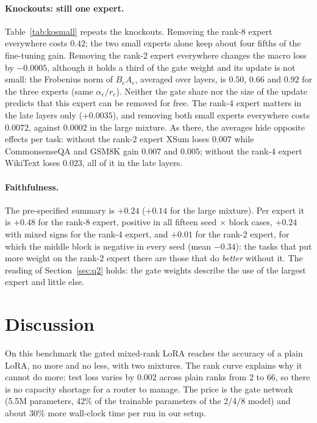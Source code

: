 \documentclass[11pt]{article}
\begin{document}
\paragraph{Knockouts: still one expert.} Table~\ref{tab:kosmall} repeats the knockouts. Removing
the rank-8 expert everywhere costs $0.42$; the two small experts alone keep about four fifths of
the fine-tuning gain. Removing the rank-2 expert everywhere changes the macro loss by $-0.0005$,
although it holds a third of the gate weight and its update is not small: the Frobenius norm of
$B_e A_e$, averaged over layers, is $0.50$, $0.66$ and $0.92$ for the three experts (same
$\alpha_e / r_e$). Neither the gate share nor the size of the update predicts that this expert
can be removed for free. The rank-4 expert matters in the late layers only ($+0.0035$), and
removing both small experts everywhere costs $0.0072$, against $0.0002$ in the large mixture.
As there, the averages hide opposite effects per task: without the rank-2 expert XSum loses
$0.007$ while CommonsenseQA and GSM8K gain $0.007$ and $0.005$; without the rank-4 expert
WikiText loses $0.023$, all of it in the late layers.

\paragraph{Faithfulness.} The pre-specified summary is $+0.24$ ($+0.14$ for the large mixture).
Per expert it is $+0.48$ for the rank-8 expert, positive in all fifteen seed $\times$ block
cases, $+0.24$ with mixed signs for the rank-4 expert, and $+0.01$ for the rank-2 expert, for
which the middle block is negative in every seed (mean $-0.34$): the tasks that put more weight
on the rank-2 expert there are those that do \emph{better} without it. The reading of
Section~\ref{sec:q2} holds: the gate weights describe the use of the largest expert and little
else.

\section{Discussion}
On this benchmark the gated mixed-rank LoRA reaches the accuracy of a plain LoRA, no more and
no less, with two mixtures. The rank curve explains why it cannot do more: test loss varies by
$0.002$ across plain ranks from 2 to 66, so there is no capacity shortage for a router to
manage. The price is the gate network (5.5M parameters, 42\% of the trainable parameters of the
2/4/8 model) and about 30\% more wall-clock time per run in our setup.
\end{document}
